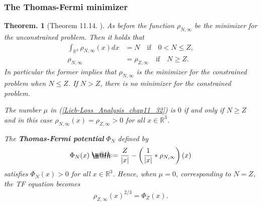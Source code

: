 \documentclass[openany, a4paper, oneside]{jsbook}
\makeatletter
\newcommand*{\defeq}{\mathrel{\rlap{%
\raisebox{0.3ex}{$\m@th\cdot$}}%
\raisebox{-0.3ex}{$\m@th\cdot$}}%
=}
\theoremstyle{break}
\theoremstyle{breakdefn}
\newtheorem{thm}{Theorem.}[section]
\newcommand{\abs}[1]{\left|#1\right|}
\newcommand{\rbk}[1]{\left (#1\right)}
\newcommand{\bbRthree}{\mathbb{R}^3}
\newcommand{\rhoNinfty}{\rho_{N, \infty}}
\newcommand{\upbf}[1]{\textup{\textbf{#1}}}
\makeatother
\begin{document}
\subsubsection{The Thomas-Fermi minimizer \label{Lieb-Loss_Analysis_chap11_39}}


\begin{thm}[Theorem 11.14. \cite{LiebLoss1}]
 As before the function $\rhoNinfty$ be the minimizer for the unconstrained problem.
 Then it holds that
 \begin{align}
  \int_{\bbRthree} \rhoNinfty (x) dx
  &=
  N \quad \mathrm{if} \quad 0 < N \leq Z, \\
  \rhoNinfty
  &=
  \rho_{Z, \infty} \quad \mathrm{if} \quad N \geq Z.
 \end{align}
 In particular the former implies that $\rhoNinfty$ is the minimizer for the constrained problem when $N \leq Z$.
 If $N > Z$, there is no minimizer for the constrained problem.

 The number $\mu$ in \textup{(\ref{Lieb-Loss_Analysis_chap11_32})} is $0$ if and only if $N \geq Z$ and in this case
 $\rhoNinfty (x) = \rho_{Z, \infty} > 0$ for all $x \in \bbRthree$.

 The \upbf{Thomas-Fermi potential} $\Phi_N$ defined by
 \begin{align}
  \Phi_N (x)
  \defeq
  \frac{Z}{\abs{x}} - \rbk{\frac{1}{\abs{x}} * \rhoNinfty} (x)
 \end{align}
 satisfies $\Phi_N (x) > 0$ for all $x \in \bbRthree$.
 Hence, when $\mu = 0$, corresponding to $N = Z$, the TF equation becomes
 \begin{align}
  \rho_{Z, \infty} (x)^{2/3}
  =
  \Phi_Z (x). \label{Lieb-Loss_Analysis_chap11_35}
 \end{align}
\end{thm}
\end{document}
